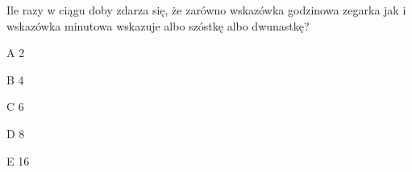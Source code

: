 \begin{tresc}
Ile razy w ciągu doby zdarza się, że zarówno wskazówka godzinowa zegarka jak i wskazówka minutowa wskazuje albo szóstkę albo dwunastkę?
\end{tresc}
\begin{wariant}{A} 2 \end{wariant}
\begin{wariant}{B} 4 \end{wariant}
\begin{wariant}{C} 6 \end{wariant}
\begin{wariant}{D} 8 \end{wariant}
\begin{wariant}{E} 16 \end{wariant}
